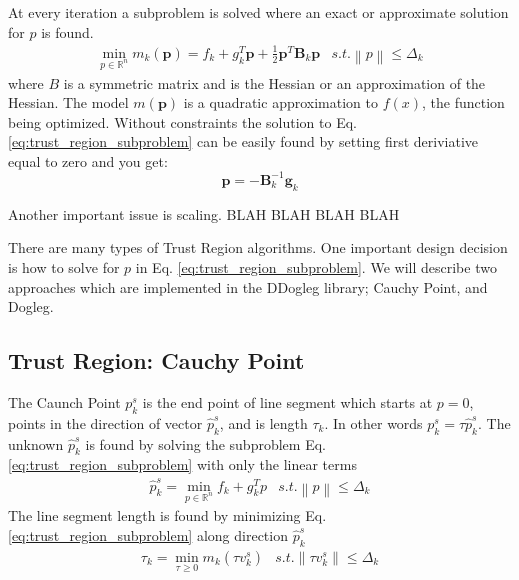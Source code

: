\documentclass[peerreview,onecolumn]{IEEEtran}
\newcommand{\R}{\mathbb{R}}
\newcommand{\norm}[1]{\left\lVert#1\right\rVert}
\begin{document}
At every iteration a subproblem is solved where an exact or approximate solution for $p$ is found.
\begin{equation}
\begin{array}{lr}
\min\limits_{p\in \R^n} m_k(\bm{p}) = f_k + g^T_k \bm{p} + \frac{1}{2}\bm{p}^T \bm{B}_k \bm{p} & s.t. \norm{p} \le \Delta_k
\end{array}
\label{eq:trust_region_subproblem}
\end{equation}
where $B$ is a symmetric matrix and is the Hessian or an approximation of the Hessian. The model $m(\bm{p})$ is a quadratic approximation to $f(x)$, the function being optimized. Without constraints  the solution to Eq. \ref{eq:trust_region_subproblem} can be easily found by setting first deriviative equal to zero and you get:
\begin{equation}
\bm{p} = -\bm{B}^{-1}_k \bm{g}_k
\label{eq:TR_unconstrained_solution}
\end{equation}

Another important issue is scaling. BLAH BLAH BLAH BLAH

There are many types of Trust Region algorithms. One important design decision is how to solve for $p$ in Eq. \ref{eq:trust_region_subproblem}. We will describe two approaches which are implemented in the DDogleg library; Cauchy Point, and Dogleg.

\subsection{Trust Region: Cauchy Point} 

The Caunch Point $p^s_k$ is the end point of line segment which starts at $p=0$, points in the direction of vector $\hat{p}^s_k$, and is length $\tau_k$. In other words $p^s_k = \tau \hat{p}^s_k$. The unknown $\hat{p}^s_k$ is found by solving the subproblem Eq. \ref{eq:trust_region_subproblem} with only the linear terms
\begin{equation}
\begin{array}{lr}
\hat{p}^s_k = \min\limits_{p\in \R^n} f_k + g_k^T p & s.t. \norm{p} \le \Delta_k
\end{array}
\end{equation}
The line segment length is found by minimizing Eq. \ref{eq:trust_region_subproblem} along direction $\hat{p}^s_k$
\begin{equation}
\begin{array}{lr}
\tau_k = \min\limits_{\tau \ge 0} m_k(\tau v^s_k) & s.t. \norm{\tau v^s_k} \le \Delta_k
\end{array}
\end{equation}
\end{document}
